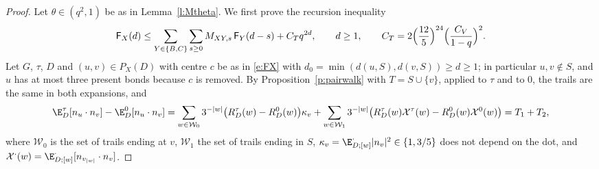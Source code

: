 \begin{proof}
Let $\theta \in (q^2, 1)$ be as in Lemma~\ref{l:Mtheta}. We first prove the recursion inequality
\begin{equation}\label{e:recineq}
\mathsf F_X(d) \le \sum_{Y \in \{B, C\}} \sum_{s \ge 0} M_{XY, s} \, \mathsf F_Y(d - s) + C_T q^{2d}, \qquad d \ge 1, \qquad C_T = 2 \Bigl( \frac{12}{5} \Bigr)^{24} \Bigl( \frac{C_V}{1 - q} \Bigr)^2 .
\end{equation}
Let $G$, $\tau$, $D$ and $(u, v) \in P_X(D)$ with centre $c$ be as in \eqref{e:FX} with $d_0 = \min(d(u, S), d(v, S)) \ge d \ge 1$; in particular $u, v \notin S$, and $u$ has at most three present bonds because $c$ is removed. By Proposition~\ref{p:pairwalk} with $T = S \cup \{v\}$, applied to $\tau$ and to $0$, the trails are the same in both expansions, and
\begin{equation*}
\E^\tau_D[n_u \cdot n_v] - \E^0_D[n_u \cdot n_v] = \sum_{w \in \mathcal W_0} 3^{-|w|} \bigl( R^\tau_D(w) - R^0_D(w) \bigr) \kappa_v + \sum_{w \in \mathcal W_1} 3^{-|w|} \bigl( R^\tau_D(w) \mathcal X^\tau(w) - R^0_D(w) \mathcal X^0(w) \bigr) = T_1 + T_2,
\end{equation*}
where $\mathcal W_0$ is the set of trails ending at $v$, $\mathcal W_1$ the set of trails ending in $S$, $\kappa_v = \E^\cdot_{D;[w]}|n_v|^2 \in \{1, 3/5\}$ does not depend on the dot, and $\mathcal X^\cdot(w) = \E^\cdot_{D;[w]}[n_{v_{|w|}} \cdot n_v]$.


\end{proof}
